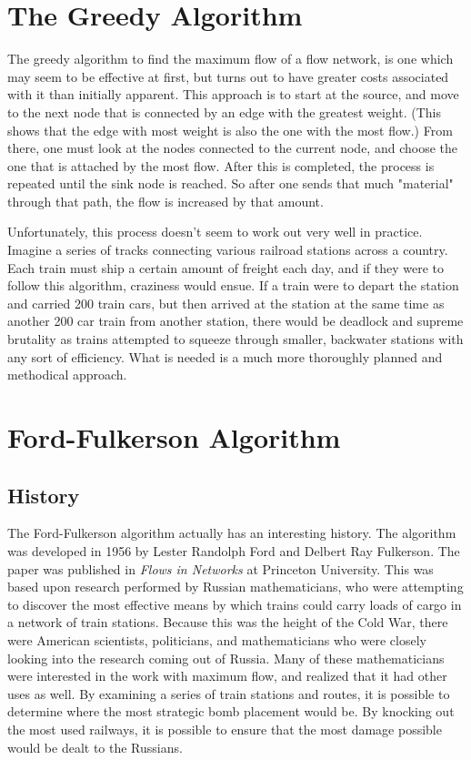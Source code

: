 \documentclass[conference]{IEEEtran}
\begin{document}
\section{The Greedy Algorithm}
The greedy algorithm to find the maximum flow of a flow network, is one which may seem to be effective at first, but turns out to have greater costs associated with it than initially apparent. This approach is to start at the source, and move to the next node that is connected by an edge with the greatest weight. (This shows that the edge with most weight is also the one with the most flow.) From there, one must look at the nodes connected to the current node, and choose the one that is attached by the most flow. After this is completed, the process is repeated until the sink node is reached. So after one sends that much "material" through that path, the flow is increased by that amount.

Unfortunately, this process doesn't seem to work out very well in practice. Imagine a series of tracks connecting various railroad stations across a country. Each train must ship a certain amount of freight each day, and if they were to follow this algorithm, craziness would ensue. If a train were to depart the station and carried 200 train cars, but then arrived at the station at the same time as another 200 car train from another station, there would be deadlock and supreme brutality as trains attempted to squeeze through smaller, backwater stations with any sort of efficiency. What is needed is a much more thoroughly planned and methodical approach.


\section{Ford-Fulkerson Algorithm}
\subsection{History}
The Ford-Fulkerson algorithm actually has an interesting history. 
The algorithm was developed in 1956 by Lester Randolph Ford and Delbert Ray Fulkerson. The paper was published in \textit{Flows in Networks} at Princeton University. This was based upon research performed by Russian mathematicians, who were attempting to discover the most effective means by which trains could carry loads of cargo in a network of train stations. Because this was the height of the Cold War, there were American scientists, politicians, and mathematicians who were closely looking into the research coming out of Russia. Many of these mathematicians were interested in the work with maximum flow, and realized that it had other uses as well. By examining a series of train stations and routes, it is possible to determine where the most strategic bomb placement would be. By knocking out the most used railways, it is possible to ensure that the most damage possible would be dealt to the Russians.
\end{document}
